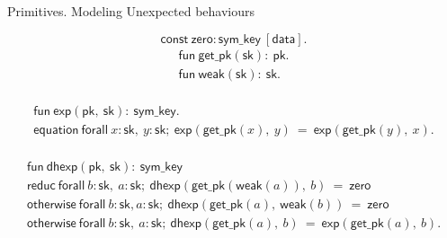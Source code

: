 \documentclass{beamer}
\begin{document}
\begin{frame}{Primitives. Modeling Unexpected behaviours}

\begin{fleqn}[\parindent]
    \begin{equation*}
      \mathsf{const}\ \mathsf{zero}:\mathsf{sym\_key}\ [\mathsf{data}].
    \end{equation*}
    \begin{equation*}\begin{array}{l}
        \mathsf{fun}\ \mathsf{get\_pk}(\mathsf{sk}):\ \mathsf{pk}. \\
        \mathsf{fun}\ \mathsf{weak}(\mathsf{sk}):\ \mathsf{sk}. \\
    \end{array}\end{equation*}
\end{fleqn}
\begin{fleqn}[\parindent]
    \begin{equation*}\begin{array}{l}
        \mathsf{fun}\ \mathsf{exp}(\mathsf{pk},\ \mathsf{sk}):\ \mathsf{sym\_key}.\\
        \mathsf{equation}\ \mathsf{forall}\ x:\mathsf{sk},\ y:\mathsf{sk};\ \mathsf{exp}(\mathsf{get\_pk}(x),\ y)\ =\ \mathsf{exp}(\mathsf{get\_pk}(y),\ x).\\
   \end{array}\end{equation*}
\end{fleqn}
   \begin{equation*}\begin{array}{l}
        \mathsf{fun}\ \mathsf{dhexp}(\mathsf{pk},\ \mathsf{sk}):\ \mathsf{sym\_key}\\
        \mathsf{reduc}\ \mathsf{forall}\ b:\mathsf{sk},\ a:\mathsf{sk};\ \mathsf{dhexp}(\mathsf{get\_pk}(\mathsf{weak}(a)),\ b)\ =\ \mathsf{zero}\\
        \mathsf{otherwise}\ \mathsf{forall}\ b:\mathsf{sk}, a:\mathsf{sk};\ \mathsf{dhexp}(\mathsf{get\_pk}(a),\ \mathsf{weak}(b))\ =\ \mathsf{zero}\\
        \mathsf{otherwise}\ \mathsf{forall}\ b:\mathsf{sk},\ a:\mathsf{sk};\ \mathsf{dhexp}(\mathsf{get\_pk}(a),\ b)\ =\ \mathsf{exp}(\mathsf{get\_pk}(a),\ b).\\
    \end{array}\end{equation*}
\end{frame}

\end{document}
